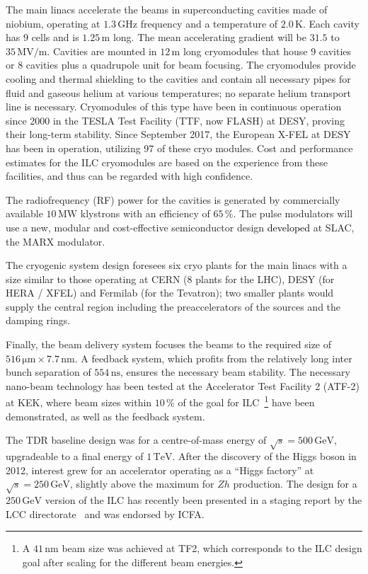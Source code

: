 \documentclass[%
 reprint,
 amsmath,amssymb,
 aps,
]{revtex4-1}
\newcommand{\jim}[1]{\textcolor{black}{#1}}
\begin{document}
The main linacs accelerate the beams in superconducting cavities made of niobium, operating at $1.3\,{\mathrm{GHz}}$ frequency and a temperature of $2.0\,{\mathrm{K}}$. 
Each cavity has $9$ cells and is $1.25\,{\mathrm{m}}$ long. The mean accelerating gradient will be $31.5$ to $35\,{\mathrm{MV/m}}$.
Cavities are mounted in $12\,{\mathrm{m}}$ long cryomodules that house $9$ cavities or $8$ cavities plus a quadrupole unit for beam focusing. 
The cryomodules provide cooling and thermal shielding to the cavities and contain all necessary pipes for fluid and gaseous helium at various temperatures; no separate helium transport line is necessary.
Cryomodules of this type have been in continuous operation since 2000 in the TESLA Test Facility (TTF, now FLASH) at DESY,  proving their long-term stability. 
Since September 2017, the European X-FEL at DESY has been in operation, utilizing 97 of these cryo modules. 
Cost and performance estimates for the ILC cryomodules are based on the experience from these facilities, and thus can be regarded with high confidence. 

The radiofrequency (RF) power for the cavities is generated by commercially available $10\,{\mathrm{MW}}$ klystrons with an efficiency of $65\,\%$. 
The pulse modulators will use a new, modular and cost-effective semiconductor design \jim{developed} at SLAC, the MARX modulator.

The cryogenic system design foresees six cryo plants for the main linacs with a size similar to those operating at CERN (8 plants for the LHC), DESY (for HERA / XFEL) and Fermilab (for the Tevatron); 
two smaller plants would supply the central region including the preaccelerators of the sources and the damping rings. 

Finally, the beam delivery system focuses the beams to the required size of $516\,{\mathrm{\mu m}} \times 7.7\,{\mathrm{nm}} $. 
A feedback system, which profits from the relatively long inter bunch separation of $554\,{\mathrm{ns}}$, ensures the necessary beam stability. 
The necessary nano-beam technology has been tested at the Accelerator Test Facility 2 (ATF-2) at KEK, where beam sizes within $10\,\%$ of the goal for ILC~\footnote{A $41\,{\mathrm{nm}}$ beam size was achieved at TF2, which corresponds to the ILC design goal after scaling for the different beam energies.} have been demonstrated, as well as the feedback system.

The TDR baseline design was for a centre-of-mass energy of $\sqrt{s}=500\,{\mathrm{GeV}}$, upgradeable to a final energy of $1\,{\mathrm{TeV}}$.
After the discovery of the Higgs boson in 2012, interest grew for an accelerator operating as a ``Higgs factory'' at $\sqrt{s}=250\,{\mathrm{GeV}}$, slightly above the maximum for $Zh$ production. 
The design for a $250\,{\mathrm{GeV}}$ version of the ILC has recently been presented in a  staging report by the LCC directorate~\cite{Evans:2017rvt} and was endorsed by ICFA.
\end{document}
